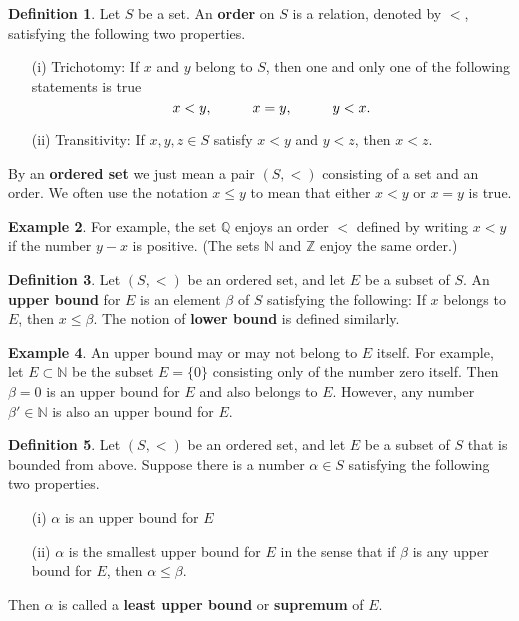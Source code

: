 \documentclass[12pt]{article}
\theoremstyle{definition}
\newtheorem{definition}{Definition}
\newtheorem{example}[definition]{Example}
\theoremstyle{theorem}
\begin{document}
\begin{definition}
Let $S$ be a set. An \textbf{order} on $S$ is a relation, denoted by $<$, satisfying the following two properties. 
\begin{enumerate}
\item[(i)] Trichotomy: If $x$ and $y$ belong to $S$, then one and only one of the following statements is true 
\[
x < y, \hspace{10mm} x = y, \hspace{10mm} y < x.
\]
\item[(ii)] Transitivity: If $x,y,z \in S$ satisfy $x < y$ and $y < z$, then $x < z$. 
\end{enumerate}
By an \textbf{ordered set} we just mean a pair $(S, <)$ consisting of a set and an order. We often use the notation $x \leqslant y$ to mean that either $x < y$ or $x = y$ is true. 
\end{definition}

\begin{example}
For example, the set $\mathbb{Q}$ enjoys an order $<$ defined by writing $x < y$ if the number $y - x$ is positive. (The sets $\mathbb{N}$ and $\mathbb{Z}$ enjoy the same order.)
\end{example}

\begin{definition}
Let $(S, <)$ be an ordered set, and let $E$ be a subset of $S$. An \textbf{upper bound} for $E$ is an element $\beta$ of $S$ satisfying the following: If $x$ belongs to $E$, then $x \leqslant \beta$. The notion of \textbf{lower bound} is defined similarly. 
\end{definition}

\begin{example}
An upper bound may or may not belong to $E$ itself. For example, let $E \subset \mathbb{N}$ be the subset $E = \{0\}$ consisting only of the number zero itself. Then $\beta = 0$ is an upper bound for $E$ and also belongs to $E$. However, any number $\beta' \in \mathbb{N}$ is also an upper bound for $E$. 
\end{example}

\begin{definition}
Let $(S, <)$ be an ordered set, and let $E$ be a subset of $S$ that is bounded from above. Suppose there is a number $\alpha \in S$ satisfying the following two properties.
\begin{enumerate}
\item[(i)] $\alpha$ is an upper bound for $E$
\item[(ii)] $\alpha$ is the smallest upper bound for $E$ in the sense that if $\beta$ is any upper bound for $E$, then $\alpha \leqslant \beta$. 
\end{enumerate} 
Then $\alpha$ is called a \textbf{least upper bound} or \textbf{supremum} of $E$. 
\end{definition}
\end{document}
